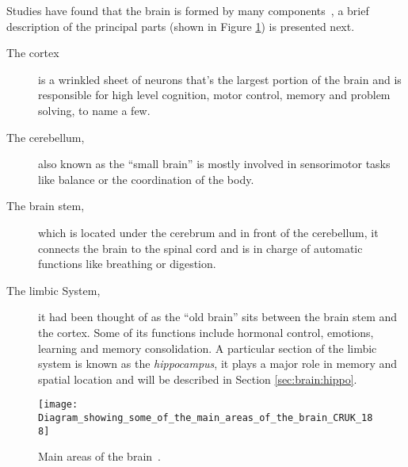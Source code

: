 

Studies have found that the brain is formed by many components~\cite{thompson2000brain}, a brief description of the principal parts (shown in Figure \ref{fig:brain:components}) is presented next. 
\begin{description}
  \item[The cortex] is a wrinkled sheet of neurons that's the largest portion of the brain and is responsible for high level cognition, motor control, memory and problem solving, to name a few.
  \item[The cerebellum,] also known as the ``small brain'' is mostly involved in sensorimotor tasks like balance or the coordination of the body.
  \item[The brain stem,] which is located under the cerebrum and in front of the cerebellum, it connects the brain to the spinal cord and is in charge of automatic functions like breathing or digestion.
  \item[The limbic System,] it had been thought of as the ``old brain'' sits between the brain stem and the cortex. Some of its functions include hormonal control, emotions, learning and memory consolidation. A particular section of the limbic system is known as the \emph{hippocampus}, it plays a major role in memory and spatial location and will be described in Section \ref{sec:brain:hippo}.
\end{description}

\begin{figure}[hbt]
  \begin{center}
    \texttt{[image: Diagram\_showing\_some\_of\_the\_main\_areas\_of\_the\_brain\_CRUK\_188]}
    \caption{Main areas of the brain~\cite{wikipedia-images}.}
    \label{fig:brain:components}
  \end{center}
  
\end{figure}

